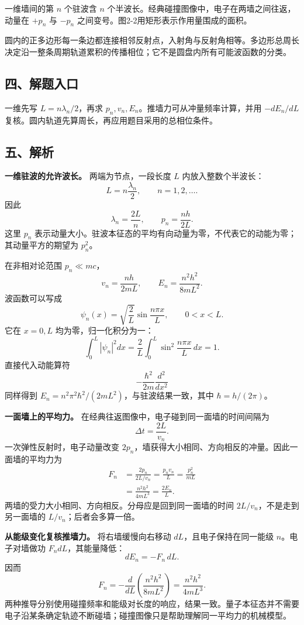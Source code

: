 \documentclass[12pt,a4paper,UTF8]{ctexart}
\begin{document}
一维墙间的第 \(n\) 个驻波含 \(n\)
个半波长。经典碰撞图像中，电子在两墙之间往返，动量在 \(+p_n\) 与
\(-p_n\) 之间变号。图2-2用矩形表示作用量围成的面积。

圆内的正多边形每一条边都连接相邻反射点，入射角与反射角相等。多边形总周长决定沿一整条周期轨道累积的传播相位；它不是圆盘内所有可能波函数的分类。

\subsection{四、解题入口}\label{ux56dbux89e3ux9898ux5165ux53e3-1}

一维先写 \(L=n\lambda_n/2\)，再求
\(p_n,v_n,E_n\)。推墙力可从冲量频率计算，并用 \(-dE_n/dL\)
复核。圆内轨道先算周长，再应用题目采用的总相位条件。

\subsection{五、解析}\label{ux4e94ux89e3ux6790-1}

\textbf{一维驻波的允许波长。} 两端为节点，一段长度 \(L\)
内放入整数个半波长： \[
L=n\frac{\lambda_n}{2},\qquad n=1,2,\ldots .
\] 因此 \[
\lambda_n=\frac{2L}{n},
\qquad
\boxed{p_n=\frac{nh}{2L}}.
\] 这里 \(p_n\)
表示动量大小。驻波本征态的平均有向动量为零，不代表它的动能为零；其动量平方的期望为
\(p_n^2\)。

在非相对论范围 \(p_n\ll mc\)， \[
\boxed{v_n=\frac{nh}{2mL}},
\qquad
\boxed{E_n=\frac{n^2h^2}{8mL^2}}.
\] 波函数可以写成 \[
\psi_n(x)=\sqrt{\frac2L}\sin\frac{n\pi x}{L},
\qquad0<x<L.
\] 它在 \(x=0,L\) 均为零，归一化积分为一： \[
\int_0^L|\psi_n|^2dx
=\frac2L\int_0^L\sin^2\frac{n\pi x}{L}\,dx=1.
\] 直接代入动能算符 \[
-\frac{\hbar^2}{2m}\frac{d^2}{dx^2}
\] 同样得到 \(E_n=n^2\pi^2\hbar^2/(2mL^2)\)，与驻波结果一致，其中
\(\hbar=h/(2\pi)\)。

\textbf{一面墙上的平均力。}
在经典往返图像中，电子碰到同一面墙的时间间隔为 \[
\Delta t=\frac{2L}{v_n}.
\] 一次弹性反射时，电子动量改变
\(2p_n\)，墙获得大小相同、方向相反的冲量。因此一面墙的平均力为 \[
\begin{aligned}
F_n
&=\frac{2p_n}{2L/v_n}
=\frac{p_nv_n}{L}
=\frac{p_n^2}{mL}\\
&=\boxed{\frac{n^2h^2}{4mL^3}}
=\frac{2E_n}{L}.
\end{aligned}
\] 两墙的受力大小相同、方向相反。分母应是回到同一面墙的时间
\(2L/v_n\)，不是走到另一面墙的 \(L/v_n\)；后者会多算一倍。

\textbf{从能级变化复核推墙力。} 将右墙缓慢向右移动
\(dL\)，且电子保持在同一能级 \(n\)。电子对墙做功
\(F_n dL\)，其能量降低： \[
dE_n=-F_n\,dL.
\] 因而 \[
F_n=-\frac{d}{dL}\left(\frac{n^2h^2}{8mL^2}\right)
=\frac{n^2h^2}{4mL^3}.
\]
两种推导分别使用碰撞频率和能级对长度的响应，结果一致。量子本征态并不需要电子沿某条确定轨迹不断碰墙；碰撞图像只是帮助理解同一平均力的机械模型。
\end{document}
